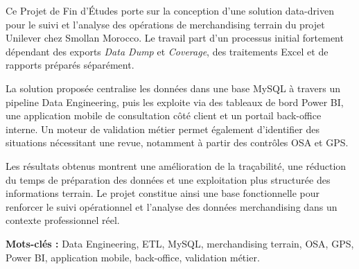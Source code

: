 {}
\thispagestyle{frontmatterstyle}


\begin{FrontTextBlock}
Ce Projet de Fin d’Études porte sur la conception d’une solution data\mbox{-}driven pour le suivi et l’analyse des opérations de merchandising terrain du projet Unilever chez Smollan Morocco. Le travail part d’un processus initial fortement dépendant des exports \textit{Data Dump} et \textit{Coverage}, des traitements Excel et de rapports préparés séparément.

La solution proposée centralise les données dans une base MySQL à travers un pipeline Data Engineering, puis les exploite via des tableaux de bord Power BI, une application mobile de consultation côté client et un portail back-office interne. Un moteur de validation métier permet également d’identifier des situations nécessitant une revue, notamment à partir des contrôles OSA et GPS.

Les résultats obtenus montrent une amélioration de la traçabilité, une réduction du temps de préparation des données et une exploitation plus structurée des informations terrain. Le projet constitue ainsi une base fonctionnelle pour renforcer le suivi opérationnel et l’analyse des données merchandising dans un contexte professionnel réel.

\vspace{0.8cm}

\noindent\textbf{Mots-clés :} Data Engineering, ETL, MySQL, merchandising terrain, OSA, GPS, Power BI, application mobile, back-office, validation métier.
\end{FrontTextBlock}